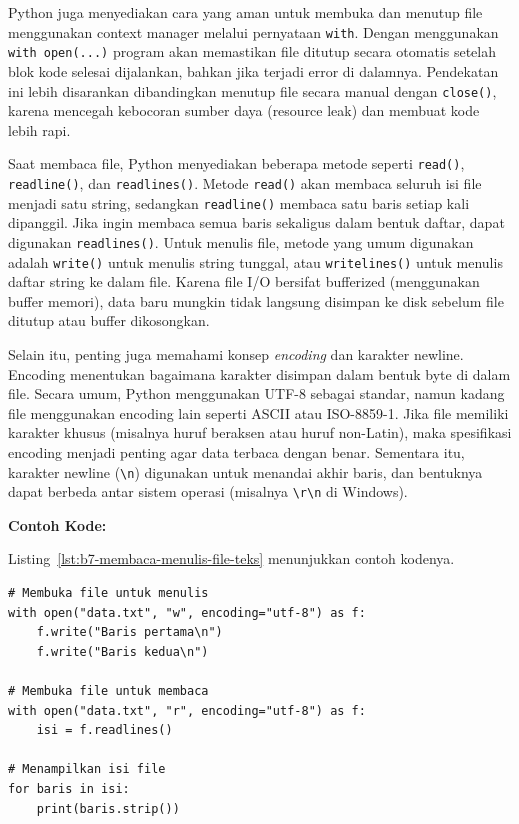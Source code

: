Python juga menyediakan cara yang aman untuk membuka dan menutup file menggunakan context manager melalui pernyataan \texttt{with}. Dengan menggunakan \texttt{with open(...)} program akan memastikan file ditutup secara otomatis setelah blok kode selesai dijalankan, bahkan jika terjadi error di dalamnya. Pendekatan ini lebih disarankan dibandingkan menutup file secara manual dengan \texttt{close()}, karena mencegah kebocoran sumber daya (resource leak) dan membuat kode lebih rapi.

Saat membaca file, Python menyediakan beberapa metode seperti \texttt{read()}, \texttt{readline()}, dan \texttt{readlines()}. Metode \texttt{read()} akan membaca seluruh isi file menjadi satu string, sedangkan \texttt{readline()} membaca satu baris setiap kali dipanggil. Jika ingin membaca semua baris sekaligus dalam bentuk daftar, dapat digunakan \texttt{readlines()}. Untuk menulis file, metode yang umum digunakan adalah \texttt{write()} untuk menulis string tunggal, atau \texttt{writelines()} untuk menulis daftar string ke dalam file. Karena file I/O bersifat bufferized (menggunakan buffer memori), data baru mungkin tidak langsung disimpan ke disk sebelum file ditutup atau buffer dikosongkan.

Selain itu, penting juga memahami konsep \textit{encoding} dan karakter newline. Encoding menentukan bagaimana karakter disimpan dalam bentuk byte di dalam file. Secara umum, Python menggunakan UTF-8 sebagai standar, namun kadang file menggunakan encoding lain seperti ASCII atau ISO-8859-1. Jika file memiliki karakter khusus (misalnya huruf beraksen atau huruf non-Latin), maka spesifikasi encoding menjadi penting agar data terbaca dengan benar. Sementara itu, karakter newline (\texttt{\textbackslash n}) digunakan untuk menandai akhir baris, dan bentuknya dapat berbeda antar sistem operasi (misalnya \texttt{\textbackslash r\textbackslash n} di Windows).

\noindent\textbf{Contoh Kode:}

Listing~\ref{lst:b7-membaca-menulis-file-teks} menunjukkan contoh kodenya.

\begin{lstlisting}[style=PythonStyle, caption={Contoh Membaca dan Menulis File Teks di Python}, label={lst:b7-membaca-menulis-file-teks}]
# Membuka file untuk menulis
with open("data.txt", "w", encoding="utf-8") as f:
    f.write("Baris pertama\n")
    f.write("Baris kedua\n")

# Membuka file untuk membaca
with open("data.txt", "r", encoding="utf-8") as f:
    isi = f.readlines()

# Menampilkan isi file
for baris in isi:
    print(baris.strip())
\end{lstlisting}


